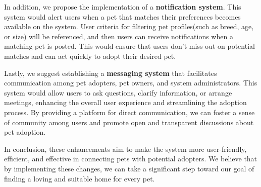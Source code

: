 In addition, we propose the implementation of a \textbf{notification system}. This system would alert users when a pet that matches their preferences becomes available on the system. User criteria for filtering pet profiles(such as breed, age, or size) will be referenced, and then users can receive notifications when a matching pet is posted. This would ensure that users don’t miss out on potential matches and can act quickly to adopt their desired pet.

Lastly, we suggest establishing a \textbf{messaging system} that facilitates communication among pet adopters, pet owners, and system administrators. This system would allow users to ask questions, clarify information, or arrange meetings, enhancing the overall user experience and streamlining the adoption process. By providing a platform for direct communication, we can foster a sense of community among users and promote open and transparent discussions about pet adoption.

In conclusion, these enhancements aim to make the system more user-friendly, efficient, and effective in connecting pets with potential adopters. We believe that by implementing these changes, we can take a significant step toward our goal of finding a loving and suitable home for every pet.

